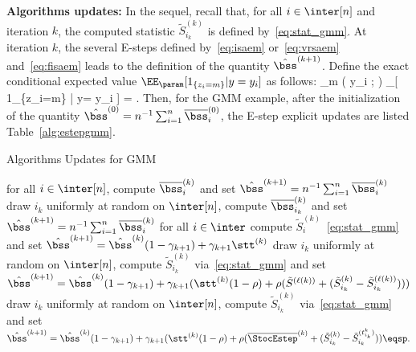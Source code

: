 \documentclass[bj]{imsart}
\numberwithin{equation}{section}
\theoremstyle{plain}
\begin{document}
\noindent \textbf{Algorithms updates:}
In the sequel, recall that, for all $i \in \inter[n]$ and iteration $k$, the computed statistic $ \tilde{S}_{i_k}^{(k)}$ is defined by~\eqref{eq:stat_gmm}.
At iteration $k$, the several E-steps defined by~\eqref{eq:isaem} or~\eqref{eq:vrsaem} and~\eqref{eq:fisaem} leads to the definition of the quantity $\hat{\bss}^{(k+1)} $. 
Define the exact conditional expected value $\EE_{\param}[ 1_{\{z_i=m\}} | y= y_{i} ]$ as follows:
\beq \notag
\widetilde{\omega}_m ( y_{i} ; \param ) \eqdef \EE_{\param}[ 1_{\{z_i=m\}} | y= y_{i} ]
=  \eqsp.
\eeq
Then, for the GMM example, after the initialization of the quantity $\hat{\bss}^{(0)} = n^{-1} \sum\nolimits_{i=1}^n \overline{\bss}_i^{(0)} $, the E-step explicit updates are listed Table~\ref{alg:estepgmm}.

 \begin{protocol}[H]
\caption{Algorithms Updates for GMM}\label{alg:estepgmm}
  \begin{algorithmic}[1]
 \hspace{0.4cm} for all $i \in \inter[n]$, compute $\overline{\bss}_{i}^{(k)}$ and set $\hat{\bss}^{(k+1)} = n^{-1} \sum\nolimits_{i=1}^n \overline{\bss}_i^{(k)}$
 \hspace{0.4cm} draw  $i_k$ uniformly at random on $\inter[n]$, compute $\overline{\bss}_{i_k}^{(k)}$ and set $\hat{\bss}^{(k+1)} = n^{-1} \sum\nolimits_{i=1}^n \overline{\bss}_i^{(k)}$
 \hspace{0.4cm} for all $i \in \inter$ compute $ \tilde{S}_{i}^{(k)}$~\eqref{eq:stat_gmm} and set  $\hat{\bss}^{(k+1)} = \hat{\bss}^{(k)}(1 - \gamma_{k+1}) + \gamma_{k+1}\stt^{(k)}$
 \hspace{0.4cm} draw  $i_k$ uniformly at random on $\inter[n]$, compute $ \tilde{S}_{i_k}^{(k)}$ via~\eqref{eq:stat_gmm} and set $\hat{\bss}^{(k+1)} = \hat{\bss}^{(k)}(1 - \gamma_{k+1})+ \gamma_{k+1} (\stt^{(k)} (1 - \rho) + \rho (\tilde{S}^{(\ell(k))} +  ( \tilde{S}_{i_k}^{(k)}  -\tilde{S}_{i_k}^{(\ell(k))}   )) ) $
 \hspace{0.4cm} draw  $i_k$ uniformly at random on $\inter[n]$, compute $ \tilde{S}_{i_k}^{(k)}$ via~\eqref{eq:stat_gmm} and set $ \hat{\bss}^{(k+1)} = \hat{\bss}^{(k)}(1 - \gamma_{k+1})+ \gamma_{k+1} (\stt^{(k)} (1 - \rho) + \rho (\overline{\StocEstep}^{(k)} + ( \tilde{S}_{i_k}^{(k)}  - \tilde{S}_{i_k}^{(t_{i_k}^k)}) ) \eqsp.$
  \end{algorithmic}
\end{protocol}
\end{document}

